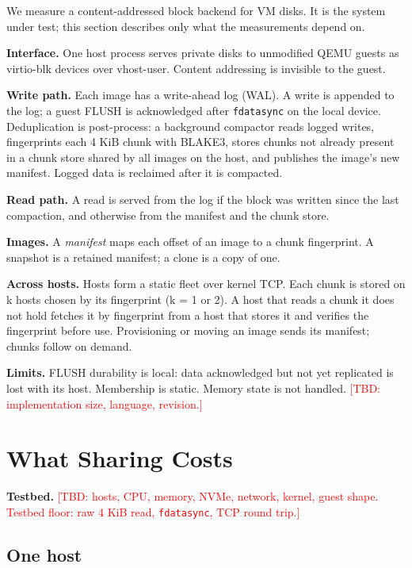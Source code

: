 \documentclass[10pt,twocolumn]{article}
\newcommand{\TBD}[1]{\textcolor{red}{[TBD: #1]}}
\begin{document}
We measure a content-addressed block backend for VM disks. It is the system under test; this section describes only what the measurements depend on.

\textbf{Interface.} One host process serves private disks to unmodified QEMU guests as virtio-blk devices over vhost-user. Content addressing is invisible to the guest.

\textbf{Write path.} Each image has a write-ahead log (WAL). A write is appended to the log; a guest FLUSH is acknowledged after \texttt{fdatasync} on the local device. Deduplication is post-process: a background compactor reads logged writes, fingerprints each 4 KiB chunk with BLAKE3, stores chunks not already present in a chunk store shared by all images on the host, and publishes the image's new manifest. Logged data is reclaimed after it is compacted.

\textbf{Read path.} A read is served from the log if the block was written since the last compaction, and otherwise from the manifest and the chunk store.

\textbf{Images.} A \emph{manifest} maps each offset of an image to a chunk fingerprint. A snapshot is a retained manifest; a clone is a copy of one.

\textbf{Across hosts.} Hosts form a static fleet over kernel TCP. Each chunk is stored on k hosts chosen by its fingerprint (k = 1 or 2). A host that reads a chunk it does not hold fetches it by fingerprint from a host that stores it and verifies the fingerprint before use. Provisioning or moving an image sends its manifest; chunks follow on demand.

\textbf{Limits.} FLUSH durability is local: data acknowledged but not yet replicated is lost with its host. Membership is static. Memory state is not handled. \TBD{implementation size, language, revision.}

\section{What Sharing Costs}

\textbf{Testbed.} \TBD{hosts, CPU, memory, NVMe, network, kernel, guest shape. Testbed floor: raw 4 KiB read, \texttt{fdatasync}, TCP round trip.}

\subsection{One host}
\end{document}
